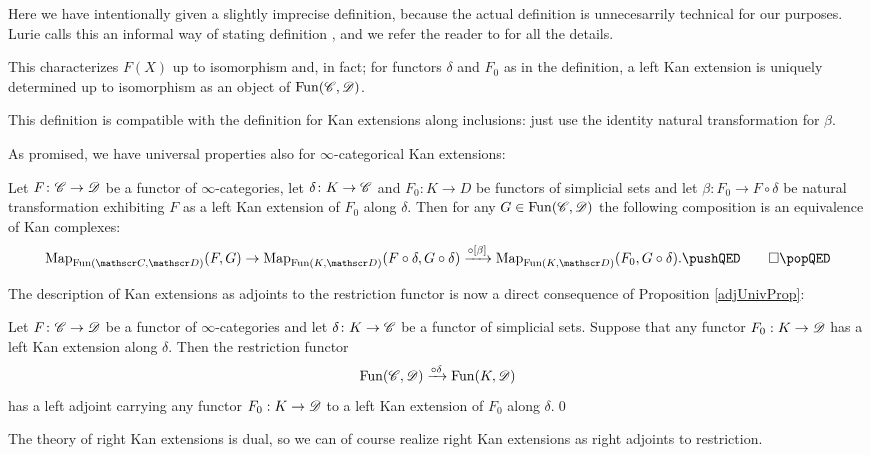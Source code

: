\documentclass[../../thesis.tex]{subfiles}
\begin{document}
\begin{remark}
    Here we have intentionally given a slightly imprecise definition, because the actual definition is unnecesarrily technical for our purposes.
    Lurie calls this an informal way of stating definition \cite[\href{https://kerodon.net/tag/02YC}{Variant 02YC}]{kerodon}, and we refer the reader to \cite[\href{https://kerodon.net/tag/02Y7}{Subsection 02Y7}]{kerodon} for all the details.
\end{remark}
\begin{remark}
    This characterizes $F(X)$ up to isomorphism and, in fact; for functors $\delta$ and $F_0$ as in the definition, a left Kan extension is uniquely determined up to isomorphism as an object of $\mathrm{Fun}(\mathscr{C}, \mathscr{D})$.
\end{remark}
\begin{remark}
    This definition is compatible with the definition for Kan extensions along inclusions: just use the identity natural transformation for $\beta$.
\end{remark}
As promised, we have universal properties also for $\infty$-categorical Kan extensions:
\begin{proposition}
    Let $F \colon\mathscr{C} \to \mathscr{D}$ be a functor of $\infty$-categories, let $\delta \colon K\to \mathscr{C}$ and $F_0 \colon K \to D$ be functors of simplicial sets and let $\beta \colon F_0 \to F \circ \delta$ be natural transformation exhibiting $F$ as a left Kan extension of $F_0$ along $\delta$.
    Then for any $G \in \mathrm{Fun}(\mathscr{C}, \mathscr{D})$ the following composition is an equivalence of Kan complexes:
    \[
        \map_{\Fun(\C,\D)}(F,G) \to \map_{\Fun(K,\D)}(F \circ \delta , G \circ \delta) \xrightarrow{\circ [\beta]} \map_{\Fun(K,\D)}(F_0, G\circ \delta).\equationQED        \]
\end{proposition}
The description of Kan extensions as adjoints to the restriction functor is now a direct consequence of Proposition \ref{adjUnivProp}:
\begin{corollary}
    Let $F \colon \mathscr{C} \to \mathscr{D}$ be a functor of $\infty$-categories and let $\delta \colon K\to \mathscr{C}$ be a functor of simplicial sets.
    Suppose that any functor $F_0 : K \to \mathscr{D}$ has a left Kan extension along $\delta$.
    Then the restriction functor
    \[
        \mathrm{Fun}(\mathscr{C}, \mathscr{D}) \xrightarrow{\circ \delta} \mathrm{Fun}(K, \mathscr{D})
    \]
    has a left adjoint carrying any functor $F_0 : K \to \mathscr{D}$ to a left Kan extension of $F_0$ along $\delta$.\qed
\end{corollary}
The theory of right Kan extensions is dual, so we can of course realize right Kan extensions as right adjoints to restriction.
\end{document}
